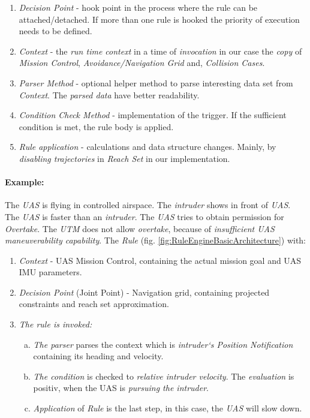 \begin{enumerate}
    \item \emph{Decision Point} - hook point in the process where the rule can be attached/detached. If more than one rule is hooked the priority of execution needs to be defined. 
    
    \item \emph{Context} - the \emph{run time context} in a time of \emph{invocation} in our case the \emph{copy} of \emph{Mission Control}, \emph{Avoidance/Navigation Grid} and,  \emph{Collision Cases}.
    
    \item \emph{Parser Method} - optional helper method to parse interesting data set from \emph{Context}. The \emph{parsed data} have better readability.
    
    \item \emph{Condition Check Method} - implementation of the trigger. If the sufficient condition is met, the rule body is applied.
    
    \item \emph{Rule application} - calculations and data structure changes. Mainly, by  \emph{disabling trajectories} in \emph{Reach Set} in our implementation.     
\end{enumerate}

\paragraph{Example:} The \emph{UAS} is flying in controlled airspace.  The \emph{intruder} shows in front of \emph{UAS}. The \emph{UAS} is faster than an \emph{intruder}. The \emph{UAS} tries to obtain permission for \emph{Overtake}. The \emph{UTM} does not allow \emph{overtake}, because of \emph{insufficient UAS maneuverability capability}. The \emph{Rule} (fig. \ref{fig:RuleEngineBasicArchitecture}) with:
\begin{enumerate}
    \item \emph{Context} - UAS Mission Control, containing the actual mission goal and UAS IMU parameters. 
    
    \item \emph{Decision Point} (Joint Point) - Navigation grid, containing projected constraints and reach set approximation.
    
    \item \emph{The rule is invoked:}
    \begin{enumerate}[a.]
        \item \emph{The parser} parses the context which is \emph{intruder`s Position Notification} containing its heading and velocity.
        
        \item \emph{The condition} is checked to \emph{relative intruder velocity}. The \emph{evaluation} is positiv, when the UAS is \emph{pursuing the intruder}.
        
        \item \emph{Application} of \emph{Rule} is the last step, in this case, the \emph{UAS} will slow down.
    \end{enumerate}
\end{enumerate}


